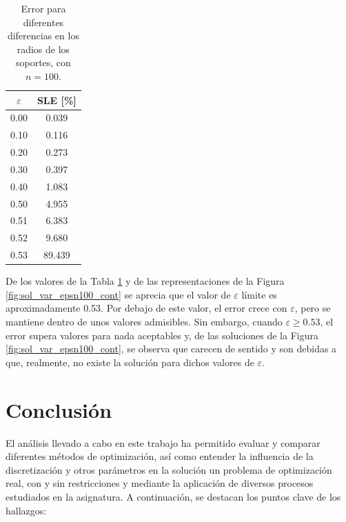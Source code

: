 \begin{table}[h]
    \caption{Error para diferentes diferencias en los radios de los soportes, con $n = 100$.}
    \centering
    \begin{tabular}{c c}
        \hline
        $\varepsilon$ & \textbf{SLE [\%]} \\ \hline \hline
        0.00 &  0.039 \\ \hline
        0.10 &  0.116 \\ \hline
        0.20 &  0.273 \\ \hline
        0.30 &  0.397 \\ \hline
        0.40 &  1.083 \\ \hline
        0.50 &  4.955 \\ \hline
        0.51 &  6.383 \\ \hline
        0.52 &  9.680 \\ \hline
        0.53 & 89.439 \\ \hline
    \end{tabular}
    \label{tab:error_sop_n100}
\end{table}

De los valores de la Tabla \ref{tab:error_sop_n100} y de las representaciones de la Figura \ref{fig:sol_var_epsn100_cont} se aprecia que el valor de $\varepsilon$ límite es aproximadamente 0.53. Por debajo de este valor, el error crece con $\varepsilon$, pero se mantiene dentro de unos valores admisibles. Sin embargo, cuando $\varepsilon \geq 0.53$, el error supera valores para nada aceptables y, de las soluciones de la Figura \ref{fig:sol_var_epsn100_cont}, se observa que carecen de sentido y son debidas a que, realmente, no existe la solución para dichos valores de $\varepsilon$.


\section{Conclusión}

El análisis llevado a cabo en este trabajo ha permitido evaluar y comparar diferentes métodos de optimización, así como entender la influencia de la discretización y otros parámetros en la solución un problema de optimización real, con y sin restricciones y mediante la aplicación de diversos procesos estudiados en la asignatura. A continuación, se destacan los puntos clave de los hallazgos:

